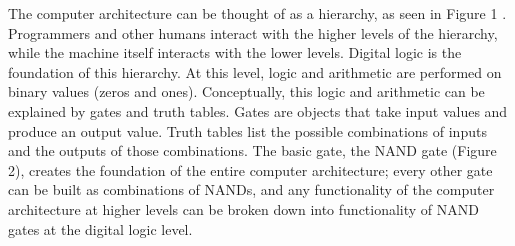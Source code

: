 The computer architecture can be thought of as a hierarchy, as seen in Figure 1 \citep{Tanenbaum}.  Programmers and other humans interact with the higher levels of the hierarchy, while the machine itself interacts with the lower levels.  Digital logic is the foundation of this hierarchy.  At this level, logic and arithmetic are performed on binary values (zeros and ones).  Conceptually, this logic and arithmetic can be explained by gates and truth tables.  Gates are objects that take input values and produce an output value.  Truth tables list the possible combinations of inputs and the outputs of those combinations.  The basic gate, the NAND gate (Figure 2), creates the foundation of the entire computer architecture; every other gate can be built as combinations of NANDs, and any functionality of the computer architecture at higher levels can be broken down into functionality of NAND gates at the digital logic level.